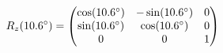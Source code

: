 \documentclass[preview]{standalone}
\begin{document}
\begin{align*}
\special{dvisvgm:raw <g id='unique000'>}R_z(10.6^\circ) = \begin{pmatrix} \cos(10.6^\circ) & -\sin(10.6^\circ) & 0 \\ \sin(10.6^\circ) & \cos(10.6^\circ) & 0 \\ 0 & 0 & 1 \end{pmatrix}\special{dvisvgm:raw </g>}
\end{align*}
\end{document}
